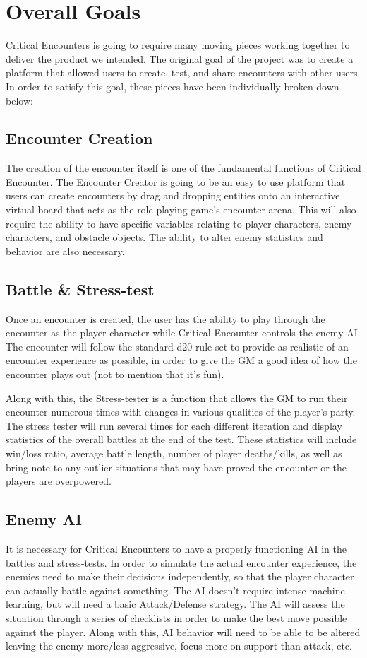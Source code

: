 \documentclass[12pt,a4paper]{report}
\begin{document}
	\section{Overall Goals}
	Critical Encounters is going to require many moving pieces working together to deliver the product we intended. The original goal of the project was to create a platform that allowed users to create, test, and share encounters with other users. In order to satisfy this goal, these pieces have been individually broken down below:
		\subsection{Encounter Creation}
		The creation of the encounter itself is one of the fundamental functions of Critical Encounter. The Encounter Creator is going to be an easy to use platform that users can create encounters by drag and dropping entities onto an interactive virtual board that acts as the role-playing game's encounter arena. This will also require the ability to have specific variables relating to player characters, enemy characters, and obstacle objects. The ability to alter enemy statistics and behavior are also necessary.
		\subsection{Battle \& Stress-test}
		Once an encounter is created, the user has the ability to play through the encounter as the player character while Critical Encounter controls the enemy AI. The encounter will follow the standard d20 rule set to provide as realistic of an encounter experience as possible, in order to give the GM a good idea of how the encounter plays out (not to mention that it's fun).
		
		Along with this, the Stress-tester is a function that allows the GM to run their encounter numerous times with changes in various qualities of the player's party. The stress tester will run several times for each different iteration and display statistics of the overall battles at the end of the test. These statistics will include win/loss ratio, average battle length, number of player deaths/kills, as well as bring note to any outlier situations that may have proved the encounter or the players are overpowered.  
		\subsection{Enemy AI}
		It is necessary for Critical Encounters to have a properly functioning AI in the battles and stress-tests. In order to simulate the actual encounter experience, the enemies need to make their decisions independently, so that the player character can actually battle against something. The AI doesn't require intense machine learning, but will need a basic Attack/Defense strategy. The AI will assess the situation through a series of checklists in order to make the best move possible against the player. Along with this, AI behavior will need to be able to be altered leaving the enemy more/less aggressive, focus more on support than attack, etc.
\end{document}
